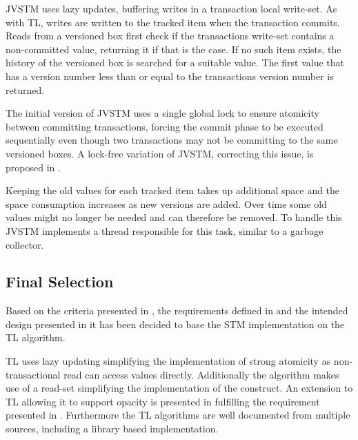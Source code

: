 JVSTM uses lazy updates, buffering writes in a transaction local write-set\cite[p. 64]{cachopo2007development}. As with TL, writes are written to the tracked item when the transaction commits. Reads from a versioned box first check if the transactions write-set contains a non-committed value, returning it if that is the case\cite[p. 64]{cachopo2007development}. If no such item exists, the history of the versioned box is searched for a suitable value. The first value that has a version number less than or equal to the transactions version number is returned\cite[p. 64]{cachopo2007development}.

The initial version of JVSTM uses a single global lock to ensure atomicity between committing transactions\cite[p. 70]{cachopo2007development}, forcing the commit phase to be executed sequentially even though two transactions may not be committing to the same versioned boxes. A lock-free variation of JVSTM, correcting this issue, is proposed in \cite{fernandes2011lock}.

Keeping the old values for each tracked item takes up additional space and the space consumption increases as new versions are added. Over time some old values might no longer be needed and can therefore be removed. To handle this JVSTM implements a thread responsible for this task\cite[p. 70]{cachopo2007development}\cite[p. 88]{cachopo2007development}, similar to a garbage collector\cite[p. 472]{fischer2009crafting}.

\subsection{Final Selection}
Based on the criteria presented in , the requirements defined in  and the intended design presented in  it has been decided to base the \ac{STM} implementation on the TL algorithm. 

TL uses lazy updating simplifying the implementation of strong atomicity as non-transactional read can access values directly. Additionally the algorithm makes use of a read-set simplifying the implementation of the  construct. An extension to TL allowing it to support opacity is presented in \cite[p. 107]{harris2010transactional} fulfilling the requirement presented in . Furthermore the TL algorithms are well documented from multiple sources, including a library based implementation\cite{dice2006transactional}\cite[p. 438]{herlihy2012art}\cite[p. 106]{harris2010transactional}.

